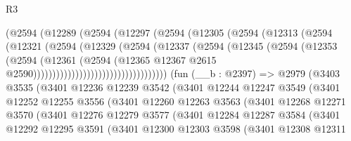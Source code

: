 \begin{lexlean}{R3}
\begin{coremodule}
                              (@2594
                                (@12289
                                  (@2594
                                    (@12297
                                      (@2594
                                        (@12305
                                          (@2594
                                            (@12313
                                              (@2594
                                                (@12321
                                                  (@2594
                                                    (@12329
                                                      (@2594
                                                        (@12337
                                                          (@2594
                                                            (@12345
                                                              (@2594
                                                                (@12353
                                                                  (@2594
                                                                    (@12361
                                                                      (@2594
                                                                        (@12365
                                                                          @12367
                                                                          @2615
                                                                          @2590)))))))))))))))))))))))))))))))))))
    (fun (__b : @2397) =>
    @2979
      (@3403
        @3535
        (@3401
          @12236
          @12239
          @3542
          (@3401
            @12244
            @12247
            @3549
            (@3401
              @12252
              @12255
              @3556
              (@3401
                @12260
                @12263
                @3563
                (@3401
                  @12268
                  @12271
                  @3570
                  (@3401
                    @12276
                    @12279
                    @3577
                    (@3401
                      @12284
                      @12287
                      @3584
                      (@3401
                        @12292
                        @12295
                        @3591
                        (@3401
                          @12300
                          @12303
                          @3598
                          (@3401
                            @12308
                            @12311

\end{coremodule}
\end{lexlean}
